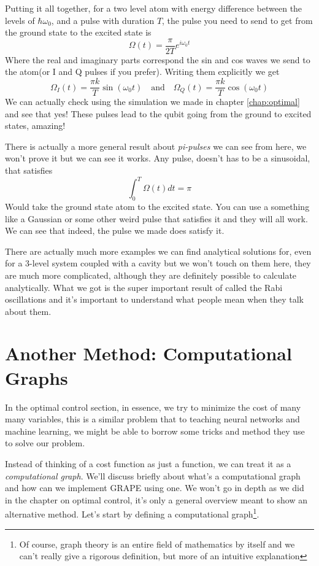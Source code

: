 \documentclass[english, a4paper, 12pt, twoside]{article}
\numberwithin{equation}{section} %
\begin{document}
Putting it all together, for a two level atom with energy difference between the levels of $\hbar \omega_0$, and a pulse with duration $T$, the pulse you need to send to get from the ground state to the excited state is
\[
    \boxed{\Omega(t) = \frac{\pi}{2 T} e^{i \omega_0 t}}
\]
Where the real and imaginary parts correspond the sin and cos waves we send to the atom(or I and Q pulses if you prefer). Writing them explicitly we get
\[
    \boxed{\Omega_I (t) = \frac{\pi k}{T} \sin (\omega_0 t)} \quad \text{and} \quad \boxed{\Omega_Q (t) = \frac{\pi k}{T} \cos (\omega_0 t)}
\]
We can actually check using the simulation we made in chapter \ref{chap:optimal} and see that yes! These pulses lead to the qubit going from the ground to excited states, amazing!

There is actually a more general result about \textit{pi-pulses} we can see from here, we won't prove it but we can see it works. Any pulse, doesn't has to be a sinusoidal, that satisfies
\[
    \int_0^T \Omega(t) dt = \pi
\]
Would take the ground state atom to the excited state. You can use a something like a Gaussian or some other weird pulse that satisfies it and they will all work. We can see that indeed, the pulse we made does satisfy it.

There are actually much more examples we can find analytical solutions for, even for a 3-level system coupled with a cavity but we won't touch on them here, they are much more complicated, although they are definitely possible to calculate analytically. What we got is the super important result of called the Rabi oscillations and it's important to understand what people mean when they talk about them.

\newpage
\section{Another Method: Computational Graphs}
In the optimal control section, in essence, we try to minimize the cost of many many variables, this is a similar problem that to teaching neural networks and machine learning, we might be able to borrow some tricks and method they use to solve our problem.

Instead of thinking of a cost function as just a function, we can treat it as a \textit{computational graph}. We'll discuss briefly about what's a computational graph and how can we implement GRAPE using one. We won't go in depth as we did in the chapter on optimal control, it's only a general overview meant to show an alternative method. Let's start by defining a computational graph\footnote{Of course, graph theory is an entire field of mathematics by itself and we can't really give a rigorous definition, but more of an intuitive explanation}.
\end{document}
